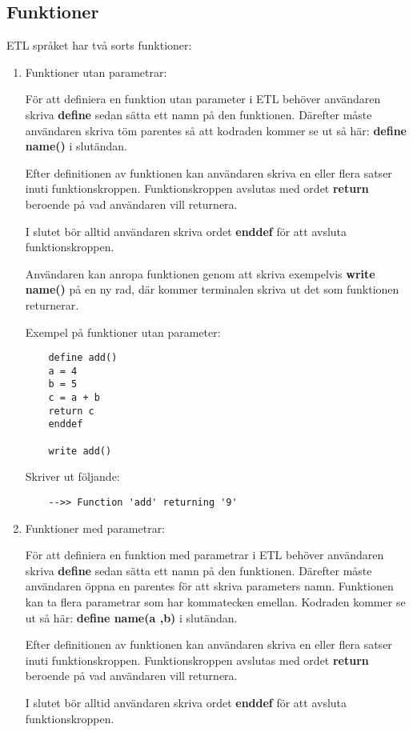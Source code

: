 \documentclass{TDP019mall}
\begin{document}
\subsection{Funktioner}
ETL språket har två sorts funktioner:
\begin{enumerate}
\item Funktioner utan parametrar:

För att definiera en funktion utan parameter i ETL behöver användaren skriva \textbf{define} sedan sätta ett namn på den funktionen. 
Därefter måste användaren skriva töm parentes så att kodraden kommer se ut så här: \textbf{define name()} i slutändan.
 
Efter definitionen av funktionen kan användaren skriva en eller flera satser inuti funktionskroppen. Funktionskroppen avslutas med 
ordet \textbf{return} beroende på vad användaren vill returnera.
 
I slutet bör alltid användaren skriva ordet \textbf{enddef} för att avsluta funktionskroppen. 
 
Användaren kan anropa funktionen genom att skriva exempelvis \textbf{write name()} på en ny rad, där kommer terminalen skriva 
ut det som funktionen returnerar.  

\newpage
Exempel på funktioner utan parameter:
\begin{verbatim}
    define add()
    a = 4
    b = 5
    c = a + b
    return c
    enddef

    write add()
\end{verbatim}
 
Skriver ut följande:
\begin{verbatim}
    -->> Function 'add' returning '9'
\end{verbatim}

 
\item Funktioner med parametrar:

För att definiera en funktion med parametrar i ETL behöver användaren skriva \textbf{define} sedan sätta ett namn på den funktionen. 
Därefter måste användaren öppna en parentes för att skriva parameters namn. Funktionen kan ta flera parametrar som har kommatecken emellan. 
Kodraden kommer se ut så här: \textbf{define name(a ,b)} i slutändan.
 
Efter definitionen av funktionen kan användaren skriva en eller flera satser inuti funktionskroppen. Funktionskroppen avslutas med 
ordet \textbf{return} beroende på vad användaren vill returnera.
 
I slutet bör alltid användaren skriva ordet \textbf{enddef} för att avsluta funktionskroppen. 
 

\end{enumerate}
\end{document}

